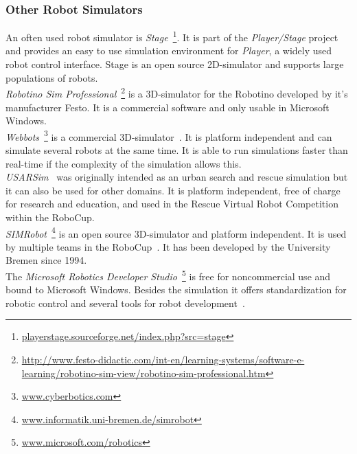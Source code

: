 \documentclass[a4paper,11pt]{article}
\begin{document}
\subsubsection{Other Robot Simulators}
An often used robot simulator is \textit{Stage}~\footnote{\url{playerstage.sourceforge.net/index.php?src=stage}}. It is part of the \textit{Player/Stage} project~\cite{PlayerStage} and provides an easy to use simulation environment for \textit{Player}, a widely used robot control interface. Stage is an open source 2D-simulator and supports large populations of robots.\\
\textit{Robotino Sim Professional}~\footnote{\url{http://www.festo-didactic.com/int-en/learning-systems/software-e-learning/robotino-sim-view/robotino-sim-professional.htm}} is a 3D-simulator for the Robotino developed by it's manufacturer Festo. It is a commercial software and only usable in Microsoft Windows.\\
\textit{Webbots}~\footnote{\url{www.cyberbotics.com}} is a commercial 3D-simulator~\cite{Webbots}. It is platform independent and can simulate several robots at the same time. It is able to run simulations faster than real-time if the complexity of the simulation allows this.\\
\textit{USARSim}~\cite{USARSim} was originally intended as an urban search and rescue simulation but it can also be used for other domains. It is platform independent, free of charge for research and education, and used in the Rescue Virtual Robot Competition within the RoboCup.\\
\textit{SIMRobot}~\footnote{\url{www.informatik.uni-bremen.de/simrobot}} is an open source 3D-simulator and platform independent. It is used by multiple teams in the RoboCup~\cite{SIMRobot}. It has been developed by the University Bremen since 1994.\\
The \textit{Microsoft Robotics Developer Studio}~\footnote{\url{www.microsoft.com/robotics}} is free for noncommercial use and bound to Microsoft Windows. Besides the simulation it offers standardization for robotic control and several tools for robot development~\cite{MicrosoftRoboticsStudio}.
\end{document}
